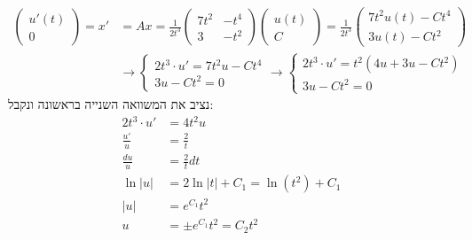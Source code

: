 \documentclass{article}
\begin{document}
\begin{align*}
    \begin{pmatrix}
        u'(t) \\
        0
    \end{pmatrix}=x' & =Ax=\frac{1}{2t^3}\begin{pmatrix}
                                             7t^2 & -t^4 \\
                                             3    & -t^2
                                         \end{pmatrix}\begin{pmatrix}
                                                          u(t) \\
                                                          C
                                                      \end{pmatrix}=\frac{1}{2t^3}\begin{pmatrix}
                                                                                      7t^2u(t)-Ct^4 \\
                                                                                      3u(t)-Ct^2
                                                                                  \end{pmatrix} \\
                     & \rightarrow \begin{cases}
                                       2t^3\cdot u' = 7t^2u - Ct^4 \\
                                       3u-Ct^2=0
                                   \end{cases} \rightarrow \begin{cases}
                                                               2t^3\cdot u' = t^2(4u+3u-Ct^2) \\
                                                               3u-Ct^2 = 0
                                                           \end{cases}
\end{align*}
נציב את המשוואה השנייה בראשונה ונקבל:
\begin{align*}
    2t^3\cdot u' & = 4t^2u                   \\
    \frac{u'}{u} & = \frac{2}{t}             \\
    \frac{du}{u} & = \frac{2}{t}dt           \\
    \ln|u|       & =2\ln|t|+C_1=\ln(t^2)+C_1 \\
    |u|          & =e^{C_1}t^2               \\
    u            & =\pm e^{C_1}t^2=C_2t^2
\end{align*}
\end{document}

